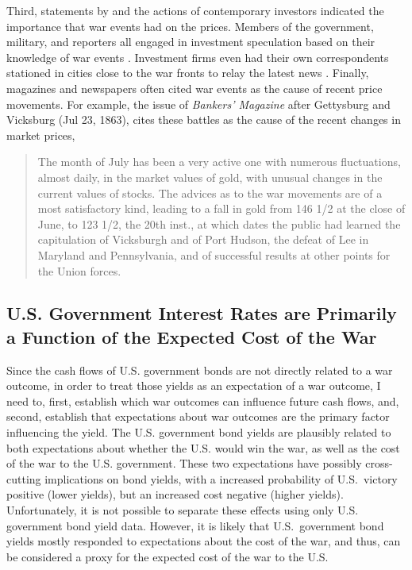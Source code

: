 Third, statements by and the actions of contemporary investors indicated the importance that war events had on the prices. %
Members of the government, military, and reporters all engaged in investment speculation based on their knowledge of war events \parencites[5-7]{Cornwallis1879}{Mitchell1903}[][1004]{WillardGuinnaneEtAl1996}.
Investment firms even had their own correspondents stationed in cities close to the war fronts to relay the latest news \parencites[5-7]{Cornwallis1879}. %
Finally, magazines and newspapers often cited war events as the cause of recent price movements. %
For example, the issue of \textit{Bankers' Magazine} after Gettysburg and Vicksburg (Jul 23, 1863), cites these battles as the cause of the recent changes in market prices,
\begin{quote}
  The month of July has been a very active one with numerous fluctuations, almost daily, in the market values of gold, with unusual changes in the current values of stocks. %
  The advices as to the war movements are of a most satisfactory kind, leading to a fall in gold from 146 1/2 at the close of June, to 123 1/2, the 20th inst., at which dates the public had learned the  capitulation of Vicksburgh and of Port Hudson, the defeat of Lee in  Maryland and Pennsylvania, and of successful results at other points  for the Union forces. %
\parencite[159]{BankersMagazine1864}
\end{quote}



\subsection{U.S. Government Interest Rates are Primarily a Function of the Expected Cost of the War}
\label{bonds_battles:sec:u.s.-governm-inter}

Since the cash flows of U.S. government bonds are not directly related to a war outcome, in order to treat those yields as an expectation of a war outcome, I need to, first, establish which war outcomes can influence future cash flows, and, second, establish that expectations about war outcomes are the primary factor influencing the yield.
The U.S. government bond yields are plausibly related to both expectations about whether the U.S. would win the war, as well as the cost of the war to the U.S. government.
These two expectations have possibly cross-cutting implications on bond yields, with a increased probability of U.S.\ victory positive (lower yields), but an increased cost negative (higher yields).
Unfortunately, it is not possible to separate these effects using only U.S. government bond yield data.
However, it is likely that U.S.\ government bond yields mostly responded to expectations about the cost of the war, and thus, can be considered a proxy for the expected cost of the war to the U.S.

